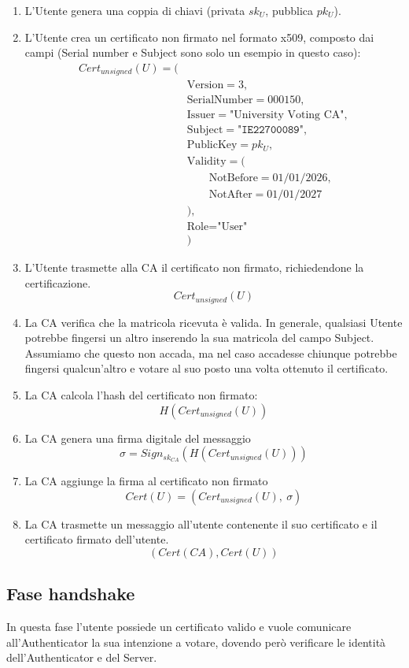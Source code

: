 \begin{enumerate}
	\item L'Utente genera una coppia di chiavi (privata $sk_U$, pubblica $pk_U$).
	\item L'Utente crea un certificato non firmato nel formato x509, composto dai campi (Serial number e Subject sono solo un esempio in questo caso):
	$$
	\begin{aligned}
		Cert_{unsigned}(U) = (& \\
		&\text{Version} = 3, \\
		&\text{SerialNumber} = 000150, \\
		&\text{Issuer} = \text{"University Voting CA"}, \\
		&\text{Subject} = \texttt{"IE22700089"}, \\
		&\text{PublicKey} = pk_U, \\
		&\text{Validity} = ( \\
		&\qquad \text{NotBefore} = 01/01/2026, \\
		&\qquad \text{NotAfter} = 01/01/2027 \\
		&), \\
		&\text{Role} = \text{"User"} \\
		&)
	\end{aligned}
	$$
	\item L'Utente trasmette alla CA il certificato non firmato, richiedendone la certificazione. $$Cert_{unsigned}(U)$$
	\item La CA verifica che la matricola ricevuta è valida. In generale, qualsiasi Utente potrebbe fingersi un altro inserendo la sua matricola del campo Subject. Assumiamo che questo non accada, ma nel caso accadesse chiunque potrebbe fingersi qualcun'altro e votare al suo posto una volta ottenuto il certificato.
	\item La CA calcola l'hash del certificato non firmato: $$H(Cert_{unsigned}(U))$$
	\item La CA genera una firma digitale del messaggio $$\sigma=Sign_{sk_{CA}}(H(Cert_{unsigned}(U)))$$
	\item La CA aggiunge la firma al certificato non firmato $$Cert(U)=(Cert_{unsigned}(U),\ \sigma)$$
	\item La CA trasmette un messaggio all'utente contenente il suo certificato e il certificato firmato dell'utente. $$(Cert(CA), Cert(U))$$
\end{enumerate}


\subsection{Fase handshake}
In questa fase l'utente possiede un certificato valido e vuole comunicare all'Authenticator la sua intenzione a votare, dovendo però verificare le identità dell'Authenticator e del Server.


